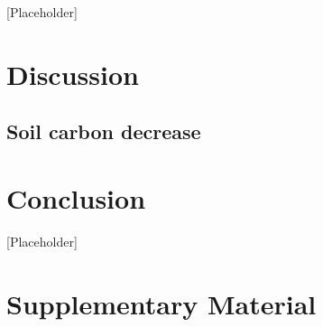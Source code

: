 \documentclass[]{article}
\begin{document}
[Placeholder]

\section{Discussion}

\subsection{Soil carbon decrease}

\section{Conclusion}

[Placeholder]


\section{Supplementary Material}
\setcounter{figure}{0}
\end{document}
